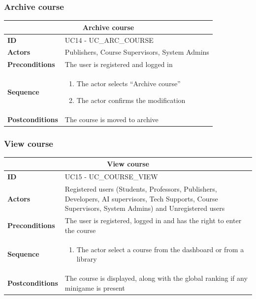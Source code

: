 \subsubsection{Archive course}
\begin{tabular}{|m{2.5cm}|m{8cm}|}
	\hline
	\multicolumn{2}{|c|}{Archive course} \\
	\hline
	\textbf{ID} & UC14 - UC\_ARC\_COURSE \\
	\hline
	\textbf{Actors} & Publishers, Course Supervisors, System Admins \\
	\hline
	\textbf{Preconditions} & The user is registered and logged in \\
	\hline
	\textbf{Sequence} & 
	\begin{enumerate}
		\item The actor selects “Archive course”
		\item The actor confirms the modification
	\end{enumerate} \\
	\hline
	\textbf{Postconditions} & The course is moved to archive \\
	\hline
\end{tabular}

\subsubsection{View course}
\begin{tabular}{|m{2.5cm}|m{8cm}|}
	\hline
	\multicolumn{2}{|c|}{View course} \\
	\hline
	\textbf{ID} & UC15 - UC\_COURSE\_VIEW \\
	\hline
	\textbf{Actors} & Registered users (Students, Professors, Publishers, Developers, AI supervisors, Tech Supports, Course Supervisors, System Admins) and Unregistered users \\
	\hline
	\textbf{Preconditions} & The user is registered, logged in and has the right to enter the course \\
	\hline
	\textbf{Sequence} & 
	\begin{enumerate}
		\item The actor select a course from the dashboard or from a library
	\end{enumerate} \\
	\hline
	\textbf{Postconditions} & The course is displayed, along with the global ranking if any minigame is present \\
	\hline
\end{tabular}

